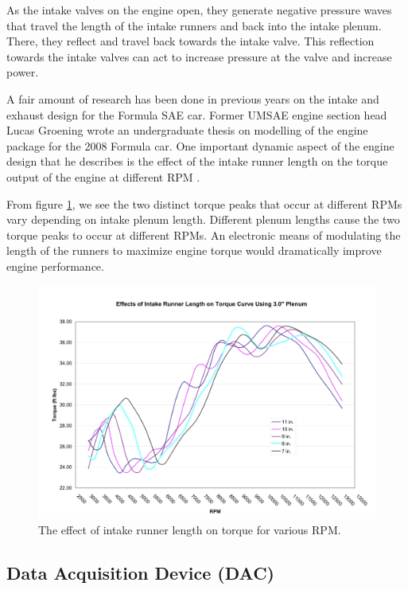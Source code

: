 As the intake valves on the engine open, they generate negative pressure waves that travel the length of the intake runners and back into the intake plenum. There, they reflect and travel back towards the intake valve. This reflection towards the intake valves can act to increase pressure at the valve and increase power.

A fair amount of research has been done in previous years on the intake and exhaust design for the Formula SAE car. Former UMSAE engine section head Lucas Groening wrote an undergraduate thesis on modelling of the engine package for the 2008 Formula car. One important dynamic aspect of the engine design that he describes is the effect of the intake runner length on the torque output of the engine at different RPM \cite{Modelingof20}. 

From figure \ref{fig:irl_effect}, we see the two distinct torque peaks that occur at different RPMs vary depending on intake plenum length. Different plenum lengths cause the two torque peaks to occur at different RPMs. An electronic means of modulating the length of the runners to maximize engine torque would dramatically improve engine performance.

\begin{figure}[H]
	\centering
	 	\includegraphics[scale=0.60]{Figures/irl_effect.png}
    \caption{The effect of intake runner length on torque for various RPM.}
    \label{fig:irl_effect}
\end{figure}

\subsection{Data Acquisition Device (DAC)}

